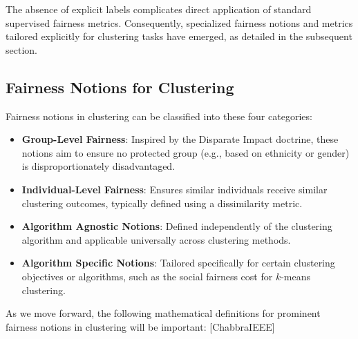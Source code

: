 The absence of explicit labels complicates direct application of
standard supervised fairness metrics. Consequently, specialized
fairness notions and metrics tailored explicitly for clustering tasks
have emerged, as detailed in the subsequent section.

\subsection{Fairness Notions for Clustering}
Fairness notions in clustering can be classified into these four categories:

\begin{itemize}
  \item \textbf{Group-Level Fairness}: Inspired by the Disparate
    Impact doctrine, these notions aim to ensure no protected group
    (e.g., based on ethnicity or gender) is disproportionately disadvantaged.
  \item \textbf{Individual-Level Fairness}: Ensures similar
    individuals receive similar clustering outcomes, typically
    defined using a dissimilarity metric.
  \item \textbf{Algorithm Agnostic Notions}: Defined independently of
    the clustering algorithm and applicable universally across
    clustering methods.
  \item \textbf{Algorithm Specific Notions}: Tailored specifically
    for certain clustering objectives or algorithms, such as the
    social fairness cost for \(k\)-means clustering.
\end{itemize}

As we move forward, the following mathematical definitions for prominent
fairness notions in clustering will be important:
[\cite{ChhabraOverview}ChabbraIEEE]

